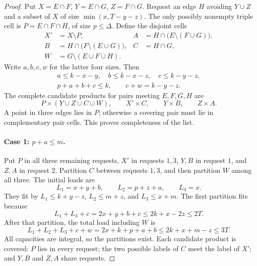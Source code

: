 \begin{proof}
Put $X=E\cap F$, $Y=E\cap G$, $Z=F\cap G$. Request an edge $H$
avoiding $Y\cup Z$ and a subset of $X$ of size
$\min(x,T-y-z)$. The only possibly nonempty triple cell is
$P=E\cap F\cap H$, of size $p\le\Delta$.
Define the disjoint cells
\begin{align*}
 X'&=X\setminus P, & A&=H\cap\bigl(E\setminus(F\cup G)\bigr),\\
 B&=H\cap\bigl(F\setminus(E\cup G)\bigr), &C&=H\cap G,\\
 W&=G\setminus(E\cup F\cup H).
\end{align*}
Write $a,b,c,w$ for the latter four sizes. Then
\begin{gather*}
 a\le k-x-y,\quad b\le k-x-z,\quad c\le k-y-z,\\
 p+a+b+c\le k,\qquad c+w=k-y-z.
\end{gather*}
The complete candidate products for pairs meeting $E,F,G,H$ are
\[
 P\times(Y\cup Z\cup C\cup W),\qquad
 X'\times C,\qquad Y\times B,\qquad Z\times A.
\]
A point in three edges lies in $P$; otherwise a covering pair must lie
in complementary pair cells. This proves completeness of the list.

\paragraph{Case 1: $p+a\le m$.}
Put $P$ in all three remaining requests, $X'$ in requests $1,3$,
$Y,B$ in request $1$, and $Z,A$ in request $2$. Partition $C$ between
requests $1,3$, and then partition $W$ among all three. The initial
loads are
\[
 L_1=x+y+b,\qquad L_2=p+z+a,\qquad L_3=x.
\]
They fit by $L_1\le k+y-z$, $L_2\le m+z$, and $L_3\le x+m$.
The first partition fits because
\[
 L_1+L_3+c=2x+y+b+c\le2k+x-2z\le2T.
\]
After that partition, the total load including $W$ is
\[
 L_1+L_2+L_3+c+w=2x+k+p+a+b\le2k+x+m-z\le3T.
\]
All capacities are integral, so the partitions exist. Each candidate
product is covered: $P$ lies in every request; the two possible labels
of $C$ meet the label of $X'$; and $Y,B$ and $Z,A$ share requests.


\end{proof}
